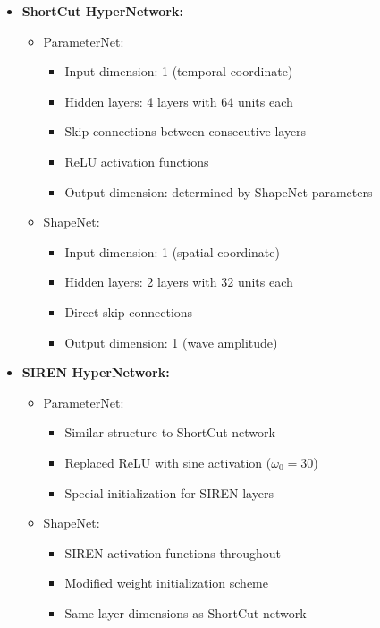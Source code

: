 \documentclass[10pt,journal,compsoc,onecolumn]{IEEEtran}
\begin{document}
\begin{itemize}
    \item \textbf{ShortCut HyperNetwork:}
    \begin{itemize}
        \item ParameterNet:
        \begin{itemize}
            \item Input dimension: 1 (temporal coordinate)
            \item Hidden layers: 4 layers with 64 units each
            \item Skip connections between consecutive layers
            \item ReLU activation functions
            \item Output dimension: determined by ShapeNet parameters
        \end{itemize}
        \item ShapeNet:
        \begin{itemize}
            \item Input dimension: 1 (spatial coordinate)
            \item Hidden layers: 2 layers with 32 units each
            \item Direct skip connections
            \item Output dimension: 1 (wave amplitude)
        \end{itemize}
    \end{itemize}

    \item \textbf{SIREN HyperNetwork:}
    \begin{itemize}
        \item ParameterNet:
        \begin{itemize}
            \item Similar structure to ShortCut network
            \item Replaced ReLU with sine activation ($\omega_0 = 30$)
            \item Special initialization for SIREN layers
        \end{itemize}
        \item ShapeNet:
        \begin{itemize}
            \item SIREN activation functions throughout
            \item Modified weight initialization scheme
            \item Same layer dimensions as ShortCut network
        \end{itemize}
    \end{itemize}
\end{itemize}
\end{document}
